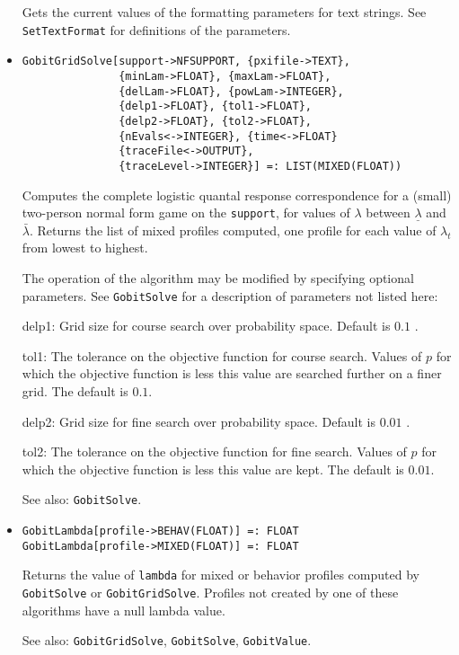 \begin{itemize}
\bd
Gets the current values of the formatting parameters for text strings.  See
\verb+SetTextFormat+ for definitions of the parameters. 
\ed

\item{}
\protect \large \begin{verbatim}
GobitGridSolve[support->NFSUPPORT, {pxifile->TEXT},
               {minLam->FLOAT}, {maxLam->FLOAT}, 
               {delLam->FLOAT}, {powLam->INTEGER}, 
               {delp1->FLOAT}, {tol1->FLOAT},
               {delp2->FLOAT}, {tol2->FLOAT},
               {nEvals<->INTEGER}, {time<->FLOAT}
               {traceFile<->OUTPUT},
               {traceLevel->INTEGER}] =: LIST(MIXED(FLOAT))
\end{verbatim}\normalsize

\bd
Computes the complete logistic quantal response correspondence for
a (small) two-person normal form game on the \verb+support+, for values of
$\lambda$ between $\underline{\lambda}$ and $\bar{\lambda}.$ Returns
the list of mixed profiles computed, one profile for each value of
$\lambda_t$ from lowest to highest.

The operation of the algorithm may be modified by specifying optional
parameters.  See \verb+GobitSolve+ for a description of parameters
not listed here:
\bd
\item
[delp1:] Grid size for course search over probability space.  Default
is $0.1$ .
\item
[tol1:] The tolerance on the objective function for course search.
Values of $p$ for which the objective function is less this value are
searched further on a finer grid.  The default is $0.1$.
\item
[delp2:] Grid size for fine search over probability space.  Default is
$0.01$ .
\item
[tol2:] The tolerance on the objective function for fine search.
Values of $p$ for which the objective function is less this value are
kept.  The default is $0.01$.  
\ed
\item [See also:] \verb+GobitSolve+.
\ed

\item{}
\protect \large \begin{verbatim}
GobitLambda[profile->BEHAV(FLOAT)] =: FLOAT
GobitLambda[profile->MIXED(FLOAT)] =: FLOAT
\end{verbatim}\normalsize

\bd
Returns the value of \verb+lambda+ for mixed or behavior profiles
computed by \verb+GobitSolve+ or \verb+GobitGridSolve+.  Profiles not
created by one of these algorithms have a null lambda value.
\item
[See also:] \verb+GobitGridSolve+, \verb+GobitSolve+, \verb+GobitValue+.
\ed


\end{itemize}
